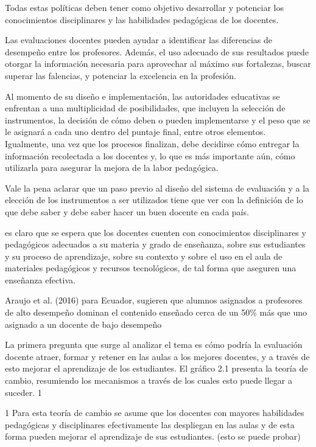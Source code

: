 Todas estas políticas deben tener como objetivo desarrollar y potenciar los conocimientos disciplinares y las habilidades pedagógicas de los docentes. 


Las evaluaciones docentes pueden ayudar a identificar las diferencias de desempeño entre los profesores. Además, el uso adecuado de sus resultados puede otorgar la información necesaria para aprovechar al máximo sus fortalezas, buscar superar las falencias, y potenciar la excelencia en la profesión.


Al momento de su diseño e implementación, las autoridades educativas se enfrentan a una multiplicidad de posibilidades, que incluyen la selección de instrumentos, la decisión de cómo deben o pueden implementarse y el peso que se le asignará a cada uno dentro del puntaje final, entre otros elementos. Igualmente, una vez que los procesos finalizan, debe decidirse cómo entregar la información recolectada a los docentes y, lo que es más importante aún, cómo utilizarla para asegurar la mejora de la labor pedagógica.


Vale la pena aclarar que un paso previo al diseño del sistema de evaluación y a la elección de los instrumentos a ser utilizados tiene que ver con la definición de lo que debe saber y debe saber hacer un buen docente en cada país.


es claro que se espera que los docentes cuenten con conocimientos disciplinares y pedagógicos adecuados a su materia y grado de enseñanza, sobre sus estudiantes y su proceso de aprendizaje, sobre su contexto y sobre el uso en el aula de materiales pedagógicos y recursos tecnológicos, de tal forma que aseguren una enseñanza efectiva.

Araujo et al. (2016) para Ecuador, sugieren que alumnos asignados a profesores de alto desempeño dominan el contenido enseñado cerca de un 50\% más que uno asignado a un docente de bajo desempeño


La primera pregunta que surge al analizar el tema es cómo podría la evaluación docente atraer, formar y retener en las aulas a los mejores docentes, y a través de esto mejorar el aprendizaje de los estudiantes. El gráfico 2.1 presenta la teoría de cambio, resumiendo los
mecanismos a través de los cuales esto puede llegar a suceder. 1

1 Para esta teoría de cambio se asume que los docentes con mayores habilidades pedagógicas y disciplinares efectivamente las despliegan en las aulas y de esta forma pueden mejorar el aprendizaje de sus estudiantes.
(esto se puede probar)


